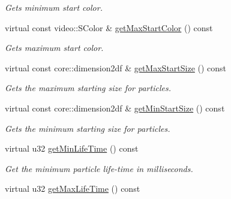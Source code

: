 \begin{DoxyCompactItemize}
\begin{DoxyCompactList}\small\item\em Gets minimum start color. \end{DoxyCompactList}\item 
\hypertarget{classirr_1_1scene_1_1_c_particle_point_emitter_a87edd932c6339b0313e0ffe714b33d22}{virtual const video\-::\-S\-Color \& \hyperlink{classirr_1_1scene_1_1_c_particle_point_emitter_a87edd932c6339b0313e0ffe714b33d22}{get\-Max\-Start\-Color} () const }\label{classirr_1_1scene_1_1_c_particle_point_emitter_a87edd932c6339b0313e0ffe714b33d22}

\begin{DoxyCompactList}\small\item\em Gets maximum start color. \end{DoxyCompactList}\item 
\hypertarget{classirr_1_1scene_1_1_c_particle_point_emitter_a5cd23b642236e0ec161c332cd6b65922}{virtual const core\-::dimension2df \& \hyperlink{classirr_1_1scene_1_1_c_particle_point_emitter_a5cd23b642236e0ec161c332cd6b65922}{get\-Max\-Start\-Size} () const }\label{classirr_1_1scene_1_1_c_particle_point_emitter_a5cd23b642236e0ec161c332cd6b65922}

\begin{DoxyCompactList}\small\item\em Gets the maximum starting size for particles. \end{DoxyCompactList}\item 
\hypertarget{classirr_1_1scene_1_1_c_particle_point_emitter_a24a84043c9aaccf46c591edf502845e0}{virtual const core\-::dimension2df \& \hyperlink{classirr_1_1scene_1_1_c_particle_point_emitter_a24a84043c9aaccf46c591edf502845e0}{get\-Min\-Start\-Size} () const }\label{classirr_1_1scene_1_1_c_particle_point_emitter_a24a84043c9aaccf46c591edf502845e0}

\begin{DoxyCompactList}\small\item\em Gets the minimum starting size for particles. \end{DoxyCompactList}\item 
\hypertarget{classirr_1_1scene_1_1_c_particle_point_emitter_a452e1ffd1f5823d1d96657217cbb54d7}{virtual u32 \hyperlink{classirr_1_1scene_1_1_c_particle_point_emitter_a452e1ffd1f5823d1d96657217cbb54d7}{get\-Min\-Life\-Time} () const }\label{classirr_1_1scene_1_1_c_particle_point_emitter_a452e1ffd1f5823d1d96657217cbb54d7}

\begin{DoxyCompactList}\small\item\em Get the minimum particle life-\/time in milliseconds. \end{DoxyCompactList}\item 
\hypertarget{classirr_1_1scene_1_1_c_particle_point_emitter_a646760443c1d44f2845971cabc38f02f}{virtual u32 \hyperlink{classirr_1_1scene_1_1_c_particle_point_emitter_a646760443c1d44f2845971cabc38f02f}{get\-Max\-Life\-Time} () const }\label{classirr_1_1scene_1_1_c_particle_point_emitter_a646760443c1d44f2845971cabc38f02f}


\end{DoxyCompactItemize}
